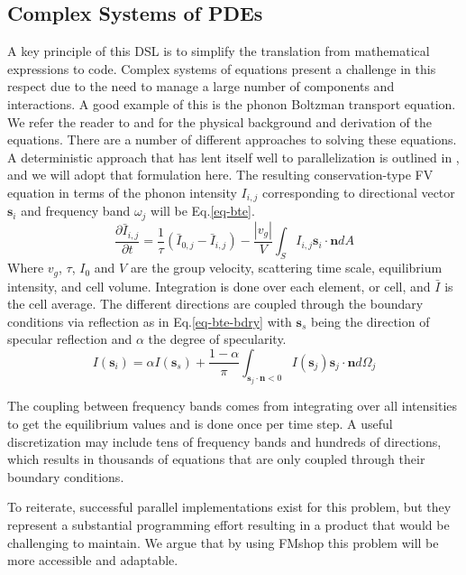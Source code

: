 \documentclass[twoside,leqno,twocolumn]{article}
\begin{document}
\subsection{Complex Systems of PDEs}
A key principle of this DSL is to simplify the translation from mathematical expressions to code. Complex systems of equations present a challenge in this respect due to the need to manage a large number of components and interactions. A good example of this is the phonon Boltzman transport equation. We refer the reader to \cite{bte2} and \cite{bte3} for the physical background and derivation of the equations. There are a number of different approaches to solving these equations. A deterministic approach that has lent itself well to parallelization is outlined in \cite{bte}, and we will adopt that formulation here. The resulting conservation-type FV equation in terms of the phonon intensity $I_{i,j}$ corresponding to directional vector $\textbf{s}_{i}$ and frequency band $\omega_{j}$ will be Eq.\ref{eq-bte}.
\begin{equation}
\label{eq-bte}
\frac{\partial \bar{I}_{i,j}}{\partial t} = \frac{1}{\tau}(\bar{I}_{0,j} - \bar{I}_{i,j}) - \frac{|v_{g}|}{V} \int_{S} I_{i,j} \textbf{s}_{i}\cdot \textbf{n} dA
\end{equation}
Where $v_{g}$, $\tau$, $I_0$ and $V$ are the group velocity, scattering time scale, equilibrium intensity, and cell volume. Integration is done over each element, or cell, and $\bar{I}$ is the cell average. The different directions are coupled through the boundary conditions via reflection as in Eq.\ref{eq-bte-bdry} with $\textbf{s}_{s}$ being the direction of specular reflection and $\alpha$ the degree of specularity.
\begin{equation}
\label{eq-bte-bdry}
I(\textbf{s}_{i}) = \alpha I(\textbf{s}_{s}) + \frac{1-\alpha}{\pi}\int_{\textbf{s}_{j}\cdot\textbf{n}<0} I(\textbf{s}_{j}) \textbf{s}_{j}\cdot\textbf{n} d\Omega_{j}
\end{equation}

The coupling between frequency bands comes from integrating over all intensities to get the equilibrium values and is done once per time step. A useful discretization may include tens of frequency bands and hundreds of directions\cite{bte}, which results in thousands of equations that are only coupled through their boundary conditions. 

To reiterate, successful parallel implementations exist for this problem, but they represent a substantial programming effort resulting in a product that would be challenging to maintain. We argue that by using FMshop this problem will be more accessible and adaptable.
\end{document}
